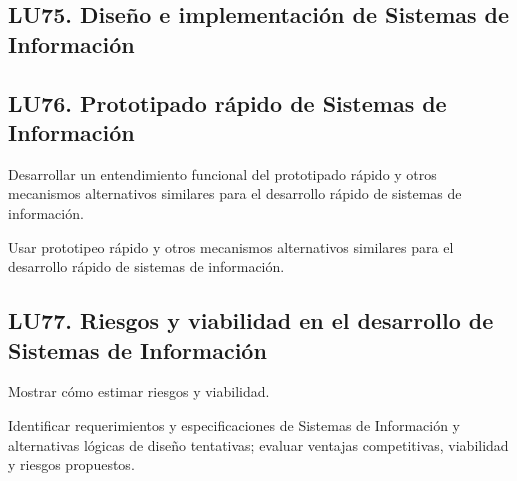 \subsection{LU75. Diseño e implementación de Sistemas de Información}\label{sec:BOK-LU75}\label{sec:LU75}
\subsection{LU76. Prototipado rápido de Sistemas de Información}\label{sec:BOK-LU76}\label{sec:LU76}
\begin{LearningUnit}
\begin{LUGoal}
\item Desarrollar un entendimiento funcional del prototipado rápido y otros mecanismos alternativos similares para el desarrollo rápido de sistemas de información.
\end{LUGoal}

\begin{LUObjective}
\item Usar prototipeo rápido y otros mecanismos alternativos similares para el desarrollo rápido de sistemas de información.
\end{LUObjective}
\end{LearningUnit}

\subsection{LU77. Riesgos y viabilidad en el desarrollo de Sistemas de Información}\label{sec:BOK-LU77}\label{sec:LU77}
\begin{LearningUnit}
\begin{LUGoal}
\item Mostrar cómo estimar riesgos y viabilidad.
\end{LUGoal}

\begin{LUObjective}
\item Identificar requerimientos y especificaciones de Sistemas de Información y alternativas lógicas de diseño tentativas; evaluar ventajas competitivas, viabilidad y riesgos propuestos.
\end{LUObjective}
\end{LearningUnit}

